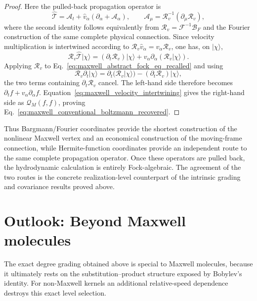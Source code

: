 \documentclass[11pt,oneside]{article}
\numberwithin{equation}{section}
\theoremstyle{definition}
\begin{document}
\begin{proof}
Here the pulled-back propagation operator is
\begin{equation}
\widehat{\mathcal T}
=
\mathcal A_t+
\widehat v_\alpha(\partial_\alpha+\mathcal A_\alpha),
\qquad
\mathcal A_\mu=\mathcal R_v^{-1}(\partial_\mu\mathcal R_v),
\label{eq:maxwell_T_recovery_definition}
\end{equation}
where the second identity follows equivalently from $\mathcal R_v=\mathcal F^{-1}\mathcal B_F$ and the Fourier construction of the same complete physical connection.  Since velocity multiplication is intertwined according to
$\mathcal R_v\widehat v_\alpha=v_\alpha\mathcal R_v$, one has, on $|\chi\rangle$,
\begin{equation}
\mathcal R_v\widehat{\mathcal T}|\chi\rangle
=
(\partial_t\mathcal R_v)|\chi\rangle
+
 v_\alpha\partial_\alpha(\mathcal R_v|\chi\rangle).
\label{eq:maxwell_T_recovery_intertwining}
\end{equation}
Applying $\mathcal R_v$ to Eq.~\eqref{eq:maxwell_abstract_fock_eq_recalled} and using
\begin{equation}
\mathcal R_v\partial_t|\chi\rangle
=
\partial_t(\mathcal R_v|\chi\rangle)
-(\partial_t\mathcal R_v)|\chi\rangle,
\end{equation}
the two terms containing $\partial_t\mathcal R_v$ cancel.  The left-hand side therefore becomes
$\partial_t f+v_\alpha\partial_\alpha f$.  Equation~\eqref{eq:maxwell_velocity_intertwining} gives the right-hand side as $\mathcal Q_M(f,f)$, proving Eq.~\eqref{eq:maxwell_conventional_boltzmann_recovered}.
\end{proof}

Thus Bargmann/Fourier coordinates provide the shortest construction of the nonlinear Maxwell vertex and an economical construction of the moving-frame connection, while Hermite-function coordinates provide an independent route to the same complete propagation operator.  Once these operators are pulled back, the hydrodynamic calculation is entirely Fock-algebraic.  The agreement of the two routes is the concrete realization-level counterpart of the intrinsic grading and covariance results proved above.


\section{Outlook: Beyond Maxwell molecules}
\label{subsec:maxwell_hard_sphere_outlook}

The exact degree grading obtained above is special to Maxwell molecules, because it ultimately rests on the substitution--product structure exposed by Bobylev's identity.  For non-Maxwell kernels an additional relative-speed dependence destroys this exact level selection.
\end{document}
